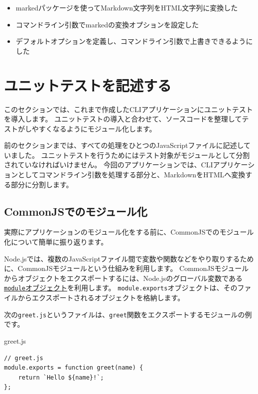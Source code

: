 \begin{itemize}
\item
  markedパッケージを使ってMarkdown文字列をHTML文字列に変換した
\item
  コマンドライン引数でmarkedの変換オプションを設定した
\item
  デフォルトオプションを定義し、コマンドライン引数で上書きできるようにした
\end{itemize}

\hypertarget{unit-test}{%
\section{ユニットテストを記述する}\label{unit-test}}

このセクションでは、これまで作成したCLIアプリケーションにユニットテストを導入します。
ユニットテストの導入と合わせて、ソースコードを整理してテストがしやすくなるようにモジュール化します。

前のセクションまでは、すべての処理をひとつのJavaScriptファイルに記述していました。
ユニットテストを行うためにはテスト対象がモジュールとして分割されていなければいけません。
今回のアプリケーションでは、CLIアプリケーションとしてコマンドライン引数を処理する部分と、MarkdownをHTMLへ変換する部分に分割します。

\hypertarget{commonjs-module}{%
\subsection{CommonJSでのモジュール化}\label{commonjs-module}}

実際にアプリケーションのモジュール化をする前に、CommonJSでのモジュール化について簡単に振り返ります。

Node.jsでは、複数のJavaScriptファイル間で変数や関数などをやり取りするために、CommonJSモジュールという仕組みを利用します。
CommonJSモジュールからオブジェクトをエクスポートするには、Node.jsのグローバル変数である\href{https://nodejs.org/api/modules.html\#modules_the_module_object}{\texttt{module}オブジェクト}を利用します。
\texttt{module.exports}オブジェクトは、そのファイルからエクスポートされるオブジェクトを格納します。

次の\texttt{greet.js}というファイルは、\texttt{greet}関数をエクスポートするモジュールの例です。

\begin{listtitle}
greet.js
\end{listtitle}
\begin{lstlisting}
// greet.js
module.exports = function greet(name) {
    return `Hello ${name}!`;
};
\end{lstlisting}
\listend

